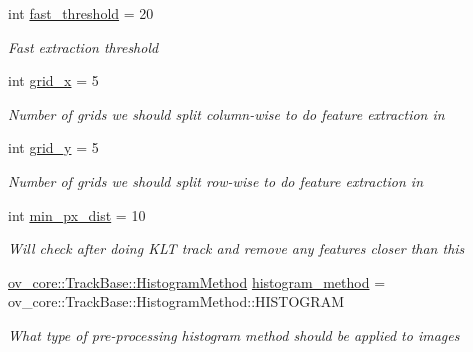 \begin{DoxyCompactItemize}
int \hyperlink{structov__msckf_1_1VioManagerOptions_a27d862f8f1811211f895b27a3b789e3a}{fast\+\_\+threshold} = 20
\begin{DoxyCompactList}\small\item\em Fast extraction threshold \end{DoxyCompactList}\item 
\mbox{\label{structov__msckf_1_1VioManagerOptions_ab52b09d507ef33dabe72d65a223fe067}} 
int \hyperlink{structov__msckf_1_1VioManagerOptions_ab52b09d507ef33dabe72d65a223fe067}{grid\+\_\+x} = 5
\begin{DoxyCompactList}\small\item\em Number of grids we should split column-\/wise to do feature extraction in \end{DoxyCompactList}\item 
\mbox{\label{structov__msckf_1_1VioManagerOptions_a678920b0804fb40a14b22da61d49d631}} 
int \hyperlink{structov__msckf_1_1VioManagerOptions_a678920b0804fb40a14b22da61d49d631}{grid\+\_\+y} = 5
\begin{DoxyCompactList}\small\item\em Number of grids we should split row-\/wise to do feature extraction in \end{DoxyCompactList}\item 
\mbox{\label{structov__msckf_1_1VioManagerOptions_a66d1e76bc9e8ffdd1c669d99fdce76b7}} 
int \hyperlink{structov__msckf_1_1VioManagerOptions_a66d1e76bc9e8ffdd1c669d99fdce76b7}{min\+\_\+px\+\_\+dist} = 10
\begin{DoxyCompactList}\small\item\em Will check after doing K\+LT track and remove any features closer than this \end{DoxyCompactList}\item 
\mbox{\label{structov__msckf_1_1VioManagerOptions_a16dc81c1a909ece39ad6b8d46e01f17f}} 
\hyperlink{classov__core_1_1TrackBase_aa4b34a5dce99b59522d57bf9278c9a1a}{ov\+\_\+core\+::\+Track\+Base\+::\+Histogram\+Method} \hyperlink{structov__msckf_1_1VioManagerOptions_a16dc81c1a909ece39ad6b8d46e01f17f}{histogram\+\_\+method} = ov\+\_\+core\+::\+Track\+Base\+::\+Histogram\+Method\+::\+H\+I\+S\+T\+O\+G\+R\+AM
\begin{DoxyCompactList}\small\item\em What type of pre-\/processing histogram method should be applied to images \end{DoxyCompactList}\item 

\end{DoxyCompactItemize}
